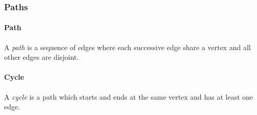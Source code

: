     \subsubsection{Paths}

      \paragraph{Path}

        A \emph{path} is a sequence of edges where each successive edge share a vertex and all other edges are disjoint.

      \paragraph{Cycle}

        A \emph{cycle} is a path which starts and ends at the same vertex and has at least one edge.
        
